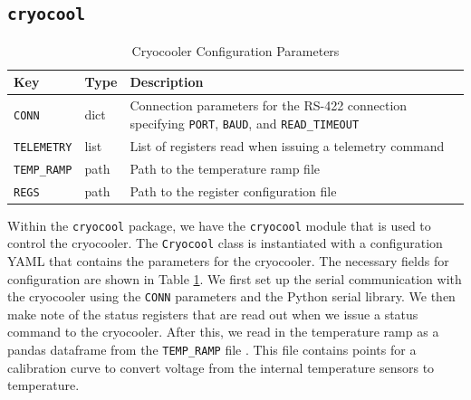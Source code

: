 \subsection{\texttt{cryocool}}
\begin{table}[ht]
    \centering
    \begin{tabularx}{\textwidth}{l|l|X}
        \textbf{Key} & \textbf{Type} & \textbf{Description} \\ \hline    
        \texttt{CONN} & dict & Connection parameters for the RS-422 connection specifying \texttt{PORT}, \texttt{BAUD}, and \texttt{READ\_TIMEOUT} \\
        \texttt{TELEMETRY} & list & List of registers read when issuing a telemetry command \\
        \texttt{TEMP\_RAMP} & path & Path to the temperature ramp file \\
        \texttt{REGS} & path & Path to the register configuration file
    \end{tabularx}
    \label{chap2/table:cryocool_config}
    \caption{Cryocooler Configuration Parameters}
\end{table}

Within the \texttt{cryocool} package, we have the \texttt{cryocool} module that is used to control the cryocooler.
The \texttt{Cryocool} class is instantiated with a configuration YAML that contains the parameters for the cryocooler. 
The necessary fields for configuration are shown in Table \ref{chap2/table:cryocool_config}.
We first set up the serial communication with the cryocooler using the \texttt{CONN} parameters and the Python serial library.
We then make note of the status registers that are read out when we issue a status command to the cryocooler.
After this, we read in the temperature ramp as a pandas dataframe from the \texttt{TEMP\_RAMP} file \citep{reback2020pandas}.
This file contains points for a calibration curve to convert voltage from the internal temperature sensors to temperature.

